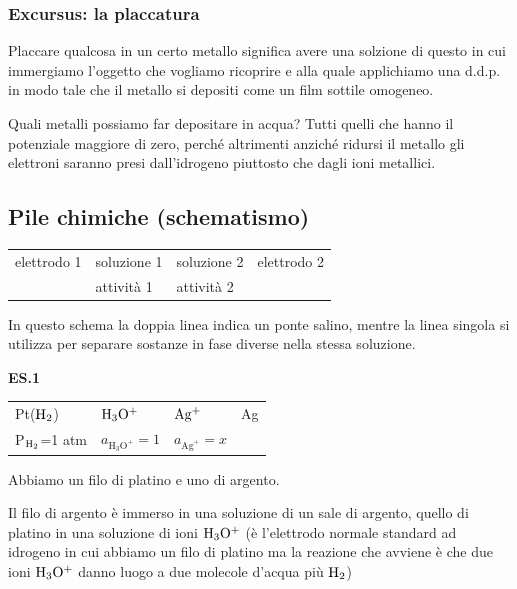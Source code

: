 \subsubsection{Excursus: la placcatura}
Placcare qualcosa in un certo metallo significa avere una solzione di questo in cui immergiamo l'oggetto che vogliamo ricoprire e alla quale applichiamo una d.d.p. in modo tale che il metallo si depositi come un film sottile omogeneo.

Quali metalli possiamo far depositare in acqua? Tutti quelli che hanno il potenziale maggiore di zero, perché altrimenti anziché ridursi il metallo gli elettroni saranno presi dall'idrogeno piuttosto che dagli ioni metallici.

\subsection{Pile chimiche (schematismo)}
\begin{center}
    \begin{tabular}{p{2cm}|p{2cm}||p{2cm}|p{2cm}}
        \vspace{0.3cm}elettrodo 1 & soluzione 1 & soluzione 2 & \vspace{0.3cm}elettrodo 2\\
        & attività 1 & attività 2 &
    \end{tabular}
\end{center}

In questo schema la doppia linea indica un ponte salino, mentre la linea singola si utilizza per separare sostanze in fase diverse nella stessa soluzione.

\vspace{0.2cm}\textbf{ES.1}
\begin{center}
    \begin{tabular}{p{2.3cm}|p{2cm}||p{1.8cm}|p{2cm}}
        Pt($\rm H_2$) & $\rm H_3O^+$ & $\rm Ag^+$ & Ag\\[0.5ex]
        P$\rm _{H_2}$=1 atm & $a_{\text{H}_3\text{O}^+}=1$ & $a_{\text{Ag}^+}=x$&\\[0.5ex]
    \end{tabular}
\end{center}

Abbiamo un filo di platino e uno di argento.

Il filo di argento è immerso in una soluzione di un sale di argento, quello di platino in una soluzione di ioni $\rm H_3O^+$ (è l'elettrodo normale standard ad idrogeno in cui abbiamo un filo di platino ma la reazione che avviene è che due ioni $\rm H_3O^+$ danno luogo a due molecole d'acqua più $\rm H_2$)

